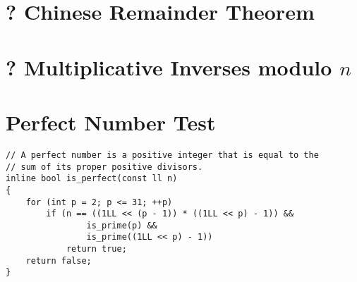 \documentclass[12pt]{book}
\begin{document}
\section{? Chinese Remainder Theorem}
\section{? Multiplicative Inverses modulo $n$}
\section{Perfect Number Test}
\begin{verbatim}
// A perfect number is a positive integer that is equal to the
// sum of its proper positive divisors.
inline bool is_perfect(const ll n)
{
	for (int p = 2; p <= 31; ++p)
		if (n == ((1LL << (p - 1)) * ((1LL << p) - 1)) &&
				is_prime(p) &&
				is_prime((1LL << p) - 1))
			return true;
	return false;
}
\end{verbatim}
\end{document}
